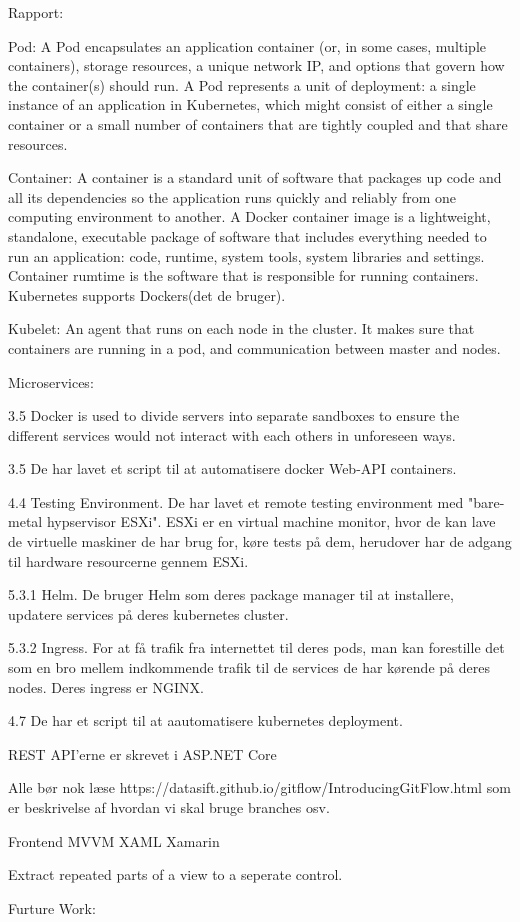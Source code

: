 Rapport:

Pod:
A Pod encapsulates an application container (or, in some cases, multiple containers), storage resources, a unique network IP, and options that govern how the container(s) should run. A Pod represents a unit of deployment: a single instance of an application in Kubernetes, which might consist of either a single container or a small number of containers that are tightly coupled and that share resources.

Container:
A container is a standard unit of software that packages up code and all its dependencies so the application runs quickly and reliably from one computing environment to another. A Docker container image is a lightweight, standalone, executable package of software that includes everything needed to run an application: code, runtime, system tools, system libraries and settings.
Container rumtime is the software that is responsible for running containers. Kubernetes supports Dockers(det de bruger).

Kubelet:
An agent that runs on each node in the cluster. It makes sure that containers are running in a pod, and communication between master and nodes.

Microservices:

3.5
Docker is used to divide servers into separate sandboxes to ensure the different services would not interact with each others in unforeseen ways. 

3.5
De har lavet et script til at automatisere docker Web-API containers.

4.4
Testing Environment.
De har lavet et remote testing environment med "bare-metal hypservisor ESXi". ESXi er en virtual machine monitor, hvor de kan lave de virtuelle maskiner de har brug for, køre tests på dem, herudover har de adgang til hardware resourcerne gennem ESXi. 

5.3.1
Helm.
De bruger Helm som deres package manager til at installere, updatere services på deres kubernetes cluster.

5.3.2
Ingress.
For at få trafik fra internettet til deres pods, man kan forestille det som en bro mellem indkommende trafik til de services de har kørende på deres nodes.
Deres ingress er NGINX.

4.7
De har et script til at aautomatisere kubernetes deployment.

REST API'erne er skrevet i ASP.NET Core

Alle bør nok læse https://datasift.github.io/gitflow/IntroducingGitFlow.html som er beskrivelse af hvordan vi skal bruge branches osv.

Frontend%
MVVM
XAML
Xamarin

Extract repeated parts of a view to a seperate control.

Furture Work:
